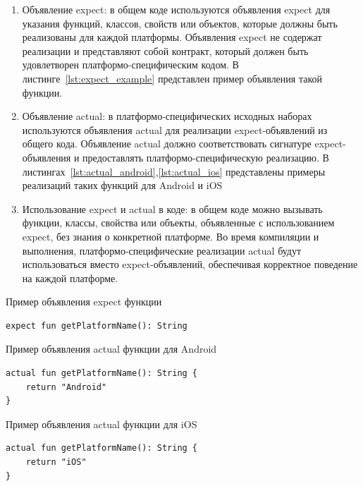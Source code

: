 \documentclass[14pt, russian]{scrartcl}
\begin{document}
\begin{enumerate}
    \item Объявление expect: в общем коде используются объявления expect для указания функций, классов, свойств или объектов, которые должны быть реализованы для каждой платформы. Объявления expect не содержат реализации и представляют собой контракт, который должен быть удовлетворен платформо-специфическим кодом. В листинге~\ref{lst:expect_example} представлен пример объявления такой функции.
    
    \item Объявление actual: в платформо-специфических исходных наборах используются объявления actual для реализации expect-объявлений из общего кода. Объявление actual должно соответствовать сигнатуре expect-объявления и предоставлять платформо-специфическую реализацию. В листингах~\ref{lst:actual_android},\ref{lst:actual_ios} представлены примеры реализаций таких функций для Android и iOS

    \item Использование expect и actual в коде: в общем коде можно вызывать функции, классы, свойства или объекты, объявленные с использованием expect, без знания о конкретной платформе. Во время компиляции и выполнения, платформо-специфические реализации actual будут использоваться вместо expect-объявлений, обеспечивая корректное поведение на каждой платформе.
    
\end{enumerate}

\begin{listing}[h]
\caption{Пример объявления expect функции}
\label{lst:expect_example}
\begin{verbatim}
expect fun getPlatformName(): String
\end{verbatim}
\end{listing}

\begin{listing}[h]
\caption{Пример объявления actual функции для Android}
\label{lst:actual_android}
\begin{verbatim}
actual fun getPlatformName(): String {
    return "Android"
}
\end{verbatim}
\end{listing}

\begin{listing}[h]
\caption{Пример объявления actual функции для iOS}
\label{lst:actual_ios}
\begin{verbatim}
actual fun getPlatformName(): String {
    return "iOS"
}
\end{verbatim}
\end{listing}
\end{document}
